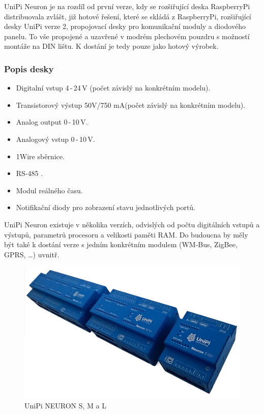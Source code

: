 UniPi Neuron je na rozdíl od první verze, kdy se rozšiřující deska RaspberryPi distribuovala zvlášt, již hotové řešení, které se skládá z RaspberryPi, rozšiřující desky UniPi verze 2, propojovací desky pro komunikační moduly a diodového panelu. To vše propojené a uzavřené v modrém plechovém pouzdru s možností montáže na DIN lištu. K dostání je tedy pouze jako hotový výrobek.


\subsubsection{Popis desky}
\begin{itemize}
\item Digitalní vstup 4\,-\,24\,V (počet závislý na konkrétním modelu).
\item Transistorový výstup 50V/750 mA(počet závislý na konkrétním modelu).
\item Analog output 0\,-\,10\,V.
\item Analogový vstup 0\,-\,10\,V.
\item 1Wire sběrnice.
\item RS-485 .
\item Modul reálného času.
\item Notifikační diody pro zobrazení stavu jednotlivých portů.
\end{itemize}

UniPi Neuron existuje v několika verzích, odvislých od počtu digitálních vstupů a výstupů, parametrů procesoru a velikosti paměti RAM. Do budoucna by měly být také k dostání verze s jedním konkrétním modulem (WM-Bus, ZigBee, GPRS, \ldots) uvnitř.

\newpage

 \begin{figure}[!h]
  \begin{center}
    \includegraphics[scale=1.05]{obrazky/unipi_unipi_verze}
  \end{center}
  \caption{UniPi NEURON S, M a L  \cite{UniPiBoard2}}
\end{figure}


